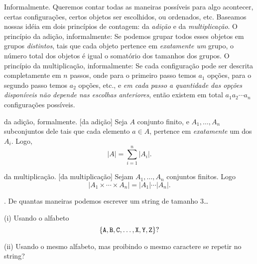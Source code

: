 \note Informalmente.
Queremos contar todas as maneiras possíveis para algo acontecer,
certas configurações, certos objetos ser escolhidos, ou ordenados, etc.
Baseamos nossas idéia em dois princípios de contagem:
da \emph{adição} e da \emph{multiplicação}.
\endgraf
{O princípio da adição, informalmente:}
Se podemos grupar todos esses objetos em grupos \emph{distintos},
tais que cada objeto pertence em \emph{exatamente um} grupo,
o número total dos objetos é igual o somatório dos tamanhos dos grupos.
\endgraf
{O princípio da multiplicação, informalmente:}
Se cada configuração pode ser descrita completamente em $n$ passos,
onde para o primeiro passo temos $a_1$ opções,
para o segundo passo temos $a_2$ opções, etc., e
\emph{em cada passo a quantidade das opções disponíveis
não depende nas escolhas anteriores},
então existem em total $a_1a_2\dotsb a_n$ configurações possíveis.

\principle da adição, formalmente.
[da adição]
Seja $A$ conjunto finito, e $A_1,\dotsc,A_n$ subconjuntos dele tais que cada elemento $a\in A$, pertence em \emph{exatamente} um dos $A_i$.
Logo,
$$
|A| = \sum_{i=1}^n |A_i|.
$$

\principle da multiplicação.
[da multiplicação]
Sejam $A_1,\dotsc,A_n$ conjuntos finitos.
Logo
$$
|A_1\times\dotsb\times A_n| = |A_1|\dotsb|A_n|.
$$

\example.
De quantas maneiras podemos escrever um string de tamanho $3$\dots
\item{(i)} Usando o alfabeto
$$
\left\{\text{\tt A}, \text{\tt B}, \text{\tt C}, \dotsc, \text{\tt X}, \text{\tt Y}, \text{\tt Z}\right\}?
$$
\item{(ii)} Usando o mesmo alfabeto, mas proibindo o mesmo caractere se repetir no string?

